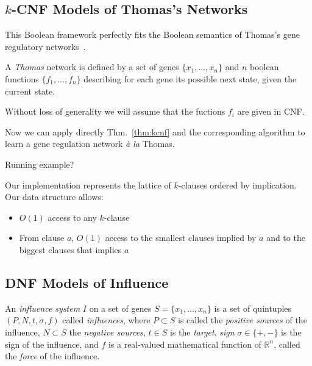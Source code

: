 \documentclass{llncs}
\begin{document}
\subsection{$k$-CNF Models of Thomas's Networks}

This Boolean framework perfectly fits the Boolean semantics of Thomas's gene
regulatory networks~\cite{GK73jtb,Thomas73jtb,TA90book}.

\begin{definition}
   A \emph{Thomas} network is defined by a set of genes $\{x_1,\dots,x_n\}$
   and $n$ boolean functions $\{f_1,\dots,f_n\}$ describing for each gene its
   possible next state, given the current state.
\end{definition}

Without loss of generality we will assume that the fuctions $f_i$ are given in
CNF\@.

Now we can apply directly Thm.~\ref{thm:kcnf} and the corresponding
algorithm to learn a gene regulation network \emph{\`a la} Thomas.

\begin{example}
   Running example?
\end{example}

Our implementation represents the lattice of $k$-clauses ordered by implication. Our data structure allows:
\begin{itemize}
	\item $O(1)$ access to any $k$-clause
	\item From clause $a$, $O(1)$ access to the smallest clauses implied by $a$ and to the biggest clauses that implies $a$
\end{itemize}

\subsection{DNF Models of Influence}

\begin{definition}

   An \emph{influence system} $I$ on a set of genes $S=\{x_1,\dots,x_n\}$ is a
   set of quintuples $(P, N, t, \sigma, f)$ called \emph{influences}, where
   $P\subset S$ is called the \emph{positive sources} of the influence,
   $N\subset S$ the \emph{negative sources}, $t\in S$ is the \emph{target},
   \emph{sign} $\sigma\in\{+,-\}$ is the sign of the influence, and $f$ is a
   real-valued mathematical function of $\mathbb{R}^n$, called the
   \emph{force} of the influence.

\end{definition}
\end{document}
